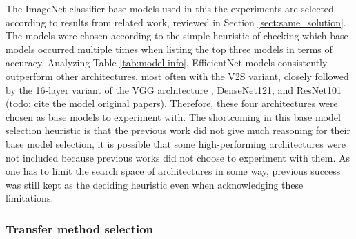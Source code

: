 \documentclass{article}
\begin{document}
The ImageNet classifier base models used in this the experiments are selected 
according to results from related work, reviewed in Section \ref{sect:same_solution}.
The models were chosen according to the simple heuristic of checking which base models 
occurred multiple times when listing the top three models in terms of accuracy. 
Analyzing Table \ref{tab:model-info}, EfficientNet models consistently outperform 
other architectures, most often with the V2S variant, closely followed by the 16-layer variant of the VGG architecture \cite{vgg},
DenseNet121, and ResNet101 (todo: cite the model original papers). Therefore, these four architectures were chosen as base models 
to experiment with. The shortcoming in this base model selection heuristic is that 
the previous work did not give much reasoning for their base model selection, it is possible that some high-performing architectures were not included 
because previous works did not choose to experiment with them. As one has to limit the 
search space of architectures in some way, previous success was still kept as the deciding heuristic 
even when acknowledging these limitations.


\subsubsection{Transfer method selection}


\end{document}
